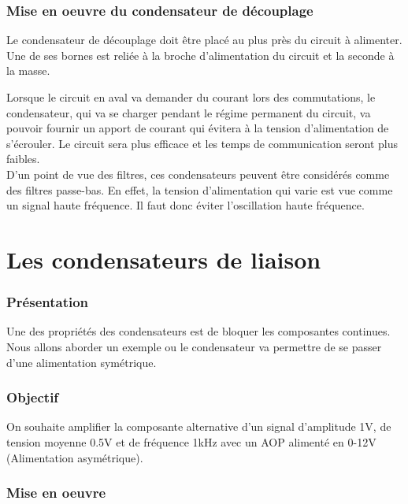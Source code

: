 \subsubsection{Mise en oeuvre du condensateur de découplage}


Le condensateur de découplage doit être placé au plus près du circuit à alimenter. Une de ses bornes est reliée à la broche d'alimentation du circuit et la seconde à la masse. \n


Lorsque le circuit en aval va demander du courant lors des commutations, le condensateur, qui va se charger pendant le régime permanent du circuit, va pouvoir fournir un apport de courant qui évitera à la tension d'alimentation de s'écrouler. 
Le circuit sera plus efficace et les temps de communication seront plus faibles. \\


D'un point de vue des filtres, ces condensateurs peuvent être considérés comme des filtres passe-bas. En effet, la tension d'alimentation qui varie est vue comme un signal haute fréquence. Il faut donc éviter l'oscillation haute fréquence.

\section{Les condensateurs de liaison}

\subsubsection{Présentation}

Une des propriétés des condensateurs est de bloquer les composantes continues.
Nous allons aborder un exemple ou le condensateur va permettre de se passer d'une alimentation symétrique. 

\subsubsection{Objectif}

On souhaite amplifier la composante alternative d'un signal d'amplitude 1V, de tension moyenne 0.5V et de fréquence 1kHz avec un AOP alimenté en 0-12V (Alimentation asymétrique).


\subsubsection{Mise en oeuvre}

